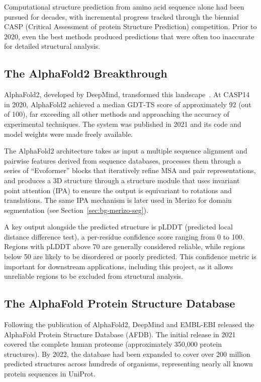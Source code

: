 Computational structure prediction from amino acid sequence alone had been pursued for decades, with incremental progress tracked through the biennial CASP (Critical Assessment of protein Structure Prediction) competition.
Prior to 2020, even the best methods produced predictions that were often too inaccurate for detailed structural analysis.

\subsection{The AlphaFold2 Breakthrough}

AlphaFold2, developed by DeepMind, transformed this landscape~\cite{alphafold2}.
At CASP14 in 2020, AlphaFold2 achieved a median GDT-TS score of approximately 92 (out of 100), far exceeding all other methods and approaching the accuracy of experimental techniques.
The system was published in 2021 and its code and model weights were made freely available.

The AlphaFold2 architecture takes as input a multiple sequence alignment and pairwise features derived from sequence databases, processes them through a series of ``Evoformer'' blocks that iteratively refine MSA and pair representations, and produces a 3D structure through a structure module that uses invariant point attention (IPA) to ensure the output is equivariant to rotations and translations.
The same IPA mechanism is later used in Merizo for domain segmentation (see Section~\ref{sec:bg-merizo-seg}).

A key output alongside the predicted structure is pLDDT (predicted local distance difference test), a per-residue confidence score ranging from 0 to 100.
Regions with pLDDT above 70 are generally considered reliable, while regions below 50 are likely to be disordered or poorly predicted.
This confidence metric is important for downstream applications, including this project, as it allows unreliable regions to be excluded from structural analysis.

\subsection{The AlphaFold Protein Structure Database}

Following the publication of AlphaFold2, DeepMind and EMBL-EBI released the AlphaFold Protein Structure Database (AFDB).
The initial release in 2021 covered the complete human proteome (approximately 350,000 protein structures).
By 2022, the database had been expanded to cover over 200 million predicted structures across hundreds of organisms, representing nearly all known protein sequences in UniProt.

